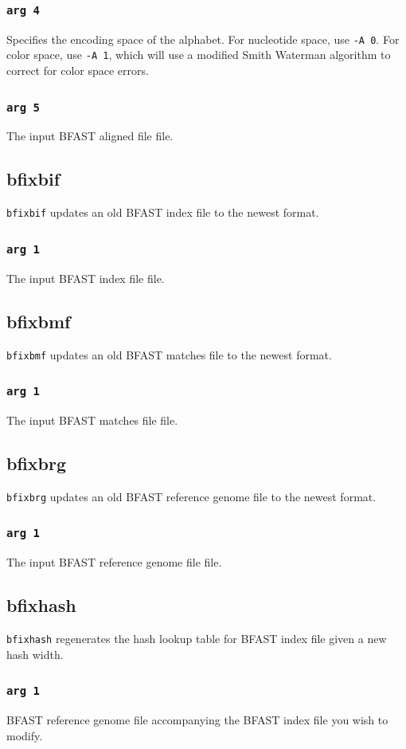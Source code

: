 \documentclass[a4paper,12pt]{book}
\newcommand{\TT}[1]{{\tt #1}} %
\newcommand{\BRGF}{BFAST reference genome file} %
\newcommand{\BIF}{BFAST index file} %
\newcommand{\BMF}{BFAST matches file} %
\newcommand{\BAF}{BFAST aligned file} %
\begin{document}
\subsubsection{\TT{arg 4}}
Specifies the encoding space of the alphabet.
For nucleotide space, use \TT{-A 0}.
For color space, use \TT{-A 1}, which will use a modified Smith Waterman algorithm to correct for color space errors.
\subsubsection{\TT{arg 5}}
The input \BAF{} file.
\subsection{bfixbif}
\label{sec:bfixbif}
\TT{bfixbif} updates an old \BIF{} to the newest format.
\subsubsection{\TT{arg 1}}
The input \BIF{} file.
\subsection{bfixbmf}
\label{sec:bfixbmf}
\TT{bfixbmf} updates an old \BMF{} to the newest format.
\subsubsection{\TT{arg 1}}
The input \BMF{} file.
\subsection{bfixbrg}
\label{sec:bfixbrg}
\TT{bfixbrg} updates an old \BRGF{} to the newest format.
\subsubsection{\TT{arg 1}}
The input \BRGF{} file.
\subsection{bfixhash}
\label{sec:bfixhash}
\TT{bfixhash} regenerates the hash lookup table for \BIF{} given a new hash width.

\subsubsection{\TT{arg 1}}
\BRGF{} accompanying the \BIF{} you wish to modify.
\end{document}
